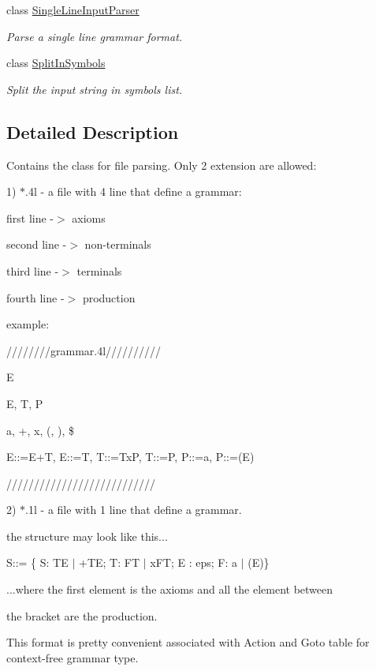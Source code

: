 \begin{DoxyCompactItemize}
class \hyperlink{classinput_parser_1_1_single_line_input_parser}{Single\-Line\-Input\-Parser}
\begin{DoxyCompactList}\small\item\em Parse a single line grammar format. \end{DoxyCompactList}\item 
class \hyperlink{classinput_parser_1_1_split_in_symbols}{Split\-In\-Symbols}
\begin{DoxyCompactList}\small\item\em Split the input string in symbols list. \end{DoxyCompactList}\end{DoxyCompactItemize}


\subsection{Detailed Description}
Contains the class for file parsing. Only 2 extension are allowed\-:\par
 1) $\ast$.4l -\/ a file with 4 line that define a grammar\-:\par
 first line -\/$>$ axioms\par
 second line -\/$>$ non-\/terminals\par
 third line -\/$>$ terminals\par
 fourth line -\/$>$ production\par
 example\-: \par
 ////////grammar.4l//////////\par
 E\par
 E, T, P\par
 a, +, x, (, ), \$\par
 E\-:\-:=E+\-T, E\-:\-:=T, T\-:\-:=Tx\-P, T\-:\-:=P, P\-:\-:=a, P\-:\-:=(E)\par
 ///////////////////////////\par


2) $\ast$.1l -\/ a file with 1 line that define a grammar.\par
 the structure may look like this...\par
 S\-:\-:= \{ S\-: T\-E $|$ +\-T\-E; T\-: F\-T $|$ x\-F\-T; E \-: eps; F\-: a $|$ (E)\}\par
 ...where the first element is the axioms and all the element between\par
 the bracket are the production.\par
 This format is pretty convenient associated with Action and Goto table for context-\/free grammar type.\par



